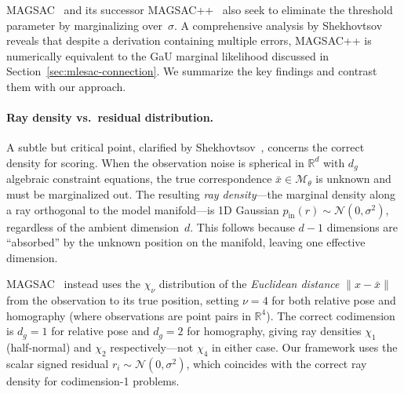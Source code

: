\documentclass[11pt]{article}
\newcommand{\Normal}{\mathcal{N}}
\begin{document}
MAGSAC~\cite{barath2019magsac} and its successor
MAGSAC++~\cite{barath2021magsac} also seek to eliminate the threshold
parameter by marginalizing over~$\sigma$.  A comprehensive analysis by
Shekhovtsov~\cite{shekhovtsov2025scoring} reveals that despite a
derivation containing multiple errors, MAGSAC++ is numerically
equivalent to the GaU marginal likelihood discussed in
Section~\ref{sec:mlesac-connection}.  We summarize the key findings
and contrast them with our approach.

\paragraph{Ray density vs.\ residual distribution.}
A subtle but critical point, clarified by
Shekhovtsov~\cite{shekhovtsov2025scoring}, concerns the correct
density for scoring.  When the observation noise is spherical in
$\mathbb{R}^d$ with $d_g$ algebraic constraint equations, the true
correspondence $\bar{x} \in \mathcal{M}_\theta$ is unknown and must
be marginalized out.  The resulting \emph{ray density}---the marginal
density along a ray orthogonal to the model manifold---is 1D Gaussian
$p_{\mathrm{in}}(r) \sim \Normal(0, \sigma^2)$, regardless of the
ambient dimension~$d$.  This follows because $d - 1$ dimensions are
``absorbed'' by the unknown position on the manifold, leaving one
effective dimension.

MAGSAC~\cite{barath2019magsac,barath2021magsac} instead uses the
$\chi_\nu$ distribution of the \emph{Euclidean distance}
$\|x - \bar{x}\|$ from the observation to its true position,
setting $\nu = 4$ for both relative pose and homography (where
observations are point pairs in $\mathbb{R}^4$).
The correct codimension is $d_g = 1$ for relative pose and $d_g = 2$
for homography, giving ray densities $\chi_1$ (half-normal) and
$\chi_2$ respectively---not $\chi_4$ in either case.
Our framework uses the scalar signed residual
$r_i \sim \Normal(0, \sigma^2)$, which coincides with the correct
ray density for codimension-1 problems.
\end{document}
